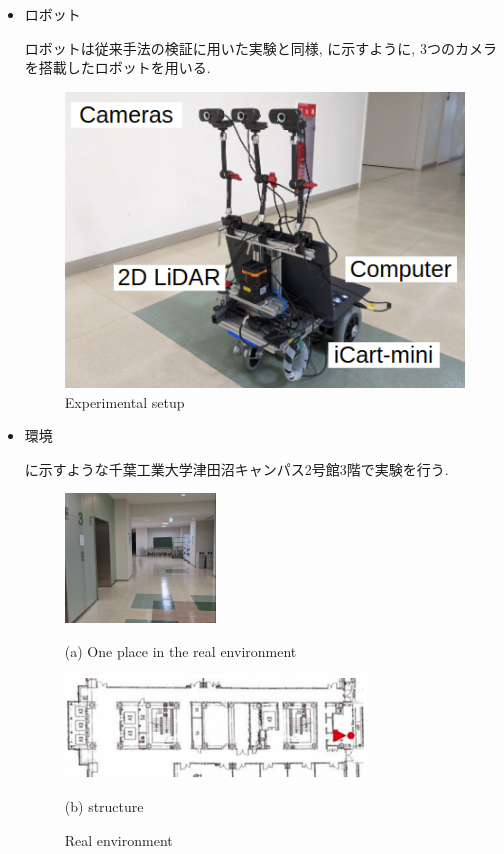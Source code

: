 \begin{itemize}
  \item ロボット
  
  ロボットは従来手法の検証に用いた実験\cite{okada1}と同様, に示すように, 3つのカメラを搭載したロボットを用いる.

  
  \begin{figure}[hbtp]
    \centering
   \includegraphics[keepaspectratio, scale=0.6]
        {images/gamma3.png}
   \caption{Experimental setup}
   \label{Fig:gamma}
  \end{figure}

  \newpage

  \item 環境

  に示すような千葉工業大学津田沼キャンパス2号館3階で実験を行う.

  \begin{figure}[h]
    \centering
    \begin{minipage}[b]{120mm}
      \centering
      \includegraphics[width=40mm]{images/real.png}
      \caption*{(a) One place in the real environment}
    \end{minipage} 
    \begin{minipage}[b]{120mm}
      \centering
      \includegraphics[width=80mm]{images/tsudanuma_structure.png}
      \caption*{(b) structure}
    \end{minipage}
    \caption{Real environment}
    \label{Fig:real_environment}
  \end{figure}
\end{itemize}

